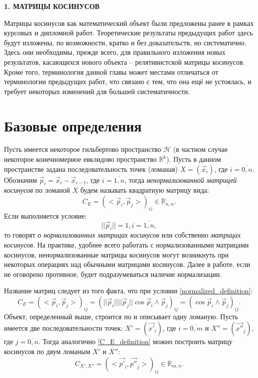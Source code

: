 \newpage
\begin{center}
	\textbf{\large 1. МАТРИЦЫ КОСИНУСОВ}
\end{center}

Матрицы косинусов как математический объект были предложены ранее в рамках курсовых и дипломной работ. Теоретические результаты предыдущих работ здесь будут изложены, по возможности, кратко и без доказательств, но систематично. Здесь они необходимы, прежде всего, для правильного изложения новых результатов, касающихся нового объекта -- релятивистской матрицы косинусов. Кроме того, терминология данной главы может местами отличаться от терминологии предыдущих работ, что связано с тем, что она ещё не устоялась, и требует некоторых изменений для большей систематичности.

\section{Базовые определения}
Пусть имеется некоторое гильбертово пространство $\mathcal{H}$ (в частном случае некоторое конечномерное евклидово пространство $\mathbb{R}^{k}$).
Пусть в данном пространстве задана последовательность точек (ломаная) $X = (\vec{x}_i)$, где $i = \overline{0,n}$. Обозначим $\vec{p}_{i} = \vec{x}_i - \vec{x}_{i-1}$, где $i = \overline{1,n}$, тогда \textit{ненормализованной матрицей косинусов} по ломаной $X$ будем называть квадратную матрицу вида:
\begin{equation}
	{C}_{E} = {(<\vec{p}_{i}, \vec{p}_{j}>)}_{ij} \in \mathbb{R}_{n,n}.
	\label{C_E_definition}
\end{equation}
Если выполняется условие:
\begin{equation}
	||\vec{p}_{i}|| = 1, i = \overline{1,n},
	\label{normalized_definition}
\end{equation}
то говорят о \textit{нормализованных матрицах косинусов} или собственно \textit{матрицах косинусов}. На практике, удобнее всего работать с нормализованными матрицами косинусов, ненормализованные матрицы косинусов могут возникнуть при некоторых операциях над обычными матрицами косинусов. Далее в работе, если не оговорено противное, будет подразумеваться наличие нормализации. 

Название матриц следует из того факта, что при условии \ref{normalized_definition}:
\begin{equation}
	{C}_{E} = {(<\vec{p}_{i}, \vec{p}_{j}>)}_{ij} = {(||\vec{p}_{i}|| ||\vec{p}_{j}|| \cos{\vec{p}_{i} \wedge \vec{p}_{j}})}_{ij} = {(\cos{\vec{p}_{i} \wedge \vec{p}_{j}})}_{ij}.
	\label{name_cosine}
\end{equation}
Объект, определенный выше, строится по и описывает одну ломаную. Пусть имеется две последовательности точек: $X' = (\vec{x'}_{i})$, где $i = \overline{0,m}$ и $X'' = (\vec{x''}_{j})$, где $j = \overline{0,n}$. Тогда аналогично \ref{C_E_definition} можно построить матрицу косинусов по двум ломаным $X'$ и $X''$:
\begin{equation}
	{C}_{X',X''} = {(<\vec{p'}_{i}, \vec{p''}_{j}>)}_{ij} \in \mathbb{R}_{m,n}.
	\label{C_X1X2_definition}
\end{equation}

